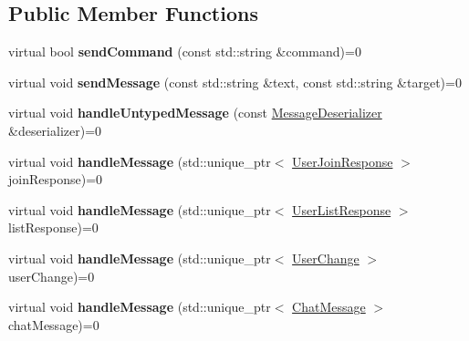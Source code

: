 \subsection*{Public Member Functions}
\begin{DoxyCompactItemize}
\item 
\hypertarget{classSimpleChat_1_1Client_afc4e5a32a2c8b9c9522ead7f101a3629}{virtual bool {\bfseries send\-Command} (const std\-::string \&command)=0}\label{classSimpleChat_1_1Client_afc4e5a32a2c8b9c9522ead7f101a3629}

\item 
\hypertarget{classSimpleChat_1_1Client_ad0504f9d44fc4a2e9bc467aa7beb0950}{virtual void {\bfseries send\-Message} (const std\-::string \&text, const std\-::string \&target)=0}\label{classSimpleChat_1_1Client_ad0504f9d44fc4a2e9bc467aa7beb0950}

\item 
\hypertarget{classSimpleChat_1_1Client_ad0b8c66ae9d8eb6a03922381da5cacb7}{virtual void {\bfseries handle\-Untyped\-Message} (const \hyperlink{classSimpleChat_1_1MessageDeserializer}{Message\-Deserializer} \&deserializer)=0}\label{classSimpleChat_1_1Client_ad0b8c66ae9d8eb6a03922381da5cacb7}

\item 
\hypertarget{classSimpleChat_1_1Client_a8de58147fb0d696d936fb890de16532b}{virtual void {\bfseries handle\-Message} (std\-::unique\-\_\-ptr$<$ \hyperlink{classSimpleChat_1_1UserJoinResponse}{User\-Join\-Response} $>$ join\-Response)=0}\label{classSimpleChat_1_1Client_a8de58147fb0d696d936fb890de16532b}

\item 
\hypertarget{classSimpleChat_1_1Client_a217efb7a31801a0b67513f88a45bd008}{virtual void {\bfseries handle\-Message} (std\-::unique\-\_\-ptr$<$ \hyperlink{classSimpleChat_1_1UserListResponse}{User\-List\-Response} $>$ list\-Response)=0}\label{classSimpleChat_1_1Client_a217efb7a31801a0b67513f88a45bd008}

\item 
\hypertarget{classSimpleChat_1_1Client_a764eb53f0c377f3a6b7bd7e969ed3836}{virtual void {\bfseries handle\-Message} (std\-::unique\-\_\-ptr$<$ \hyperlink{classSimpleChat_1_1UserChange}{User\-Change} $>$ user\-Change)=0}\label{classSimpleChat_1_1Client_a764eb53f0c377f3a6b7bd7e969ed3836}

\item 
\hypertarget{classSimpleChat_1_1Client_af23c5866ac9992d98afd4cd6a71da0cd}{virtual void {\bfseries handle\-Message} (std\-::unique\-\_\-ptr$<$ \hyperlink{classSimpleChat_1_1ChatMessage}{Chat\-Message} $>$ chat\-Message)=0}\label{classSimpleChat_1_1Client_af23c5866ac9992d98afd4cd6a71da0cd}


\end{DoxyCompactItemize}
